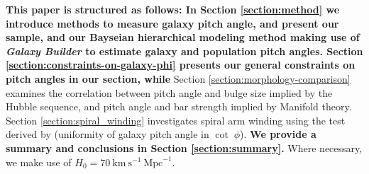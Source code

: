 \textbf{This paper is structured as follows: In Section \ref{section:method} we introduce methods to measure galaxy pitch angle, and present our sample, and our Bayseian hierarchical modeling method making use of \textit{Galaxy Builder} to estimate galaxy and population pitch angles. Section \ref{section:constraints-on-galaxy-phi} presents our general constraints on pitch angles in our section, while} Section \ref{section:morphology-comparison} examines the correlation between pitch angle and bulge size implied by the Hubble sequence, and pitch angle and bar strength implied by Manifold theory. Section \ref{section:spiral_winding} investigates spiral arm winding using the test derived by \cite{2019arXiv190910291P} (uniformity of galaxy pitch angle in $\cot\;\phi$). \textbf{We provide a summary and conclusions in Section \ref{section:summary}.}  Where necessary, we make use of $H_0 = 70\ \text{km}\ \text{s}^{-1}\ \text{Mpc}^{-1}$.
